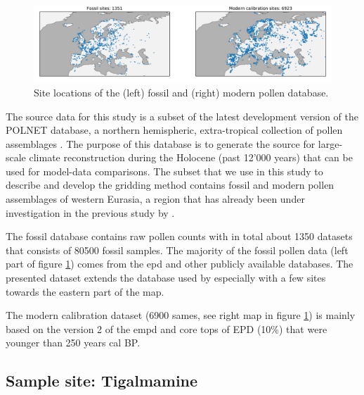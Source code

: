 \documentclass[
11pt, %
english, %
singlespacing, %
headsepline, %
]{MastersDoctoralThesis} %
\begin{document}
\begin{NoHyper}
\begin{refsection}
\begin{figure}
	\includegraphics[width=\linewidth]{gridding-figures/sitelocs.pdf}
	\caption[Pollen Database]{Site locations of the (left) fossil and (right) modern pollen database.}
	\label{fig:gridding-fossil}
\end{figure}

The source data for this study is a subset of the latest development version of the POLNET database, a northern hemispheric, extra-tropical collection of pollen assemblages \citep{DavisKaplan2017, SommerDavisChevalierEtAl2019}. The purpose of this database is to generate the source for large-scale climate reconstruction during the Holocene (past 12'000 years) that can be used for model-data comparisons. The subset that we use in this study to describe and develop the gridding method contains fossil and modern pollen assemblages of western Eurasia, a region that has already been under investigation in the previous study by \cite{MauriDavisCollinsEtAl2015}. 

The fossil database contains raw pollen counts with in total about 1350 datasets that consists of 80500 fossil samples. The majority of the fossil pollen data (left part of figure \ref{fig:gridding-fossil}) comes from the \gls{epd} \citep[ca. 94\%]{FyfeBeaulieuBinneyEtAl2009} and other publicly available databases. The presented dataset extends the database used by \cite{MauriDavisCollinsEtAl2015} especially with a few sites towards the eastern part of the map.

The modern calibration dataset (6900 sames, see right map in figure \ref{fig:gridding-fossil}) is mainly based on the version 2 of the \gls{empd} \citep[ca. 87\%, see also chapter \ref{chp:empd}]{DavisZanonCollinsEtAl2013} and core tops of EPD (10\%) that were younger than 250 years cal BP.


\subsection{Sample site: Tigalmamine} \label{sec:gridding-sample-site}


\end{refsection}
\end{NoHyper}
\end{document}
